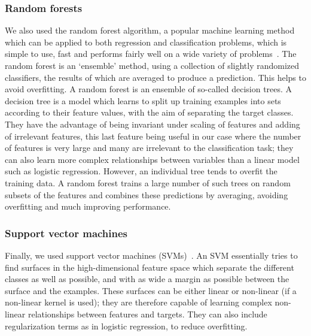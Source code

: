 \documentclass[10pt,letterpaper]{article}
\begin{document}

\subsubsection*{Random forests}
We also used the random forest algorithm, a popular machine learning method which can be applied to both regression and classification problems, which is simple to use, fast and performs fairly well on a wide variety of problems~\cite{Hastie2009}. The random forest is an `ensemble' method, using a collection of slightly randomized classifiers, the results of which are averaged to produce a prediction. This helps to avoid overfitting. A random forest is an ensemble of so-called decision trees. A decision tree is a model which learns to split up training examples into sets according to their feature values, with the aim of separating the target classes. They have the advantage of being invariant under scaling of features and adding of irrelevant features, this last feature being useful in our case where the number of features is very large and many are irrelevant to the classification task; they can also learn more complex relationships between variables than a linear model such as logistic regression. However, an individual tree tends to overfit the training data. A random forest trains a large number of such trees on random subsets of the features and combines these predictions by averaging, avoiding overfitting and much improving performance. 

\subsubsection*{Support vector machines}
Finally, we used support vector machines (SVMs)~\cite{Hastie2009a}. An SVM essentially tries to find surfaces in the high-dimensional feature space which separate the different classes as well as possible, and with as wide a margin as possible between the surface and the examples. These surfaces can be either linear or non-linear (if a non-linear kernel is used); they are therefore capable of learning complex non-linear relationships between features and targets. They can also include regularization terms as in logistic regression, to reduce overfitting. 
\end{document}
